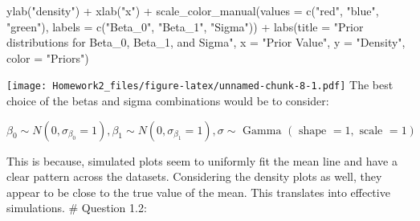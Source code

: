\documentclass[
]{article}
\newenvironment{Shaded}{\begin{snugshade}}{\end{snugshade}}
\newcommand{\AttributeTok}[1]{\textcolor[rgb]{0.77,0.63,0.00}{#1}}
\newcommand{\FunctionTok}[1]{\textcolor[rgb]{0.00,0.00,0.00}{#1}}
\newcommand{\NormalTok}[1]{#1}
\newcommand{\SpecialCharTok}[1]{\textcolor[rgb]{0.00,0.00,0.00}{#1}}
\newcommand{\StringTok}[1]{\textcolor[rgb]{0.31,0.60,0.02}{#1}}
\begin{document}
\begin{Shaded}
\begin{Highlighting}[]
  \FunctionTok{ylab}\NormalTok{(}\StringTok{"density"}\NormalTok{) }\SpecialCharTok{+} 
  \FunctionTok{xlab}\NormalTok{(}\StringTok{"x"}\NormalTok{) }\SpecialCharTok{+} 
  \FunctionTok{scale\_color\_manual}\NormalTok{(}\AttributeTok{values =} \FunctionTok{c}\NormalTok{(}\StringTok{"red"}\NormalTok{, }\StringTok{"blue"}\NormalTok{, }\StringTok{"green"}\NormalTok{), }
                     \AttributeTok{labels =} \FunctionTok{c}\NormalTok{(}\StringTok{"Beta\_0"}\NormalTok{, }\StringTok{"Beta\_1"}\NormalTok{, }\StringTok{"Sigma"}\NormalTok{)) }\SpecialCharTok{+}
  \FunctionTok{labs}\NormalTok{(}\AttributeTok{title =} \StringTok{"Prior distributions for Beta\_0, Beta\_1, and Sigma"}\NormalTok{,}
       \AttributeTok{x =} \StringTok{"Prior Value"}\NormalTok{,}
       \AttributeTok{y =} \StringTok{"Density"}\NormalTok{,}
       \AttributeTok{color =} \StringTok{"Priors"}\NormalTok{)}
\end{Highlighting}
\end{Shaded}

\texttt{[image: Homework2\_files/figure-latex/unnamed-chunk-8-1.pdf]} The
best choice of the betas and sigma combinations would be to consider:

\[\begin{equation}
\beta_0 \sim N\left(0, \sigma_{\beta_0}=1\right), \beta_1 \sim N\left(0, \sigma_{\beta_1}=1\right), \sigma \sim \text { Gamma }(\text { shape }=1, \text { scale }=1)
\end{equation}\]

This is because, simulated plots seem to uniformly fit the mean line and
have a clear pattern across the datasets. Considering the density plots
as well, they appear to be close to the true value of the mean. This
translates into effective simulations. \# Question 1.2:
\end{document}
